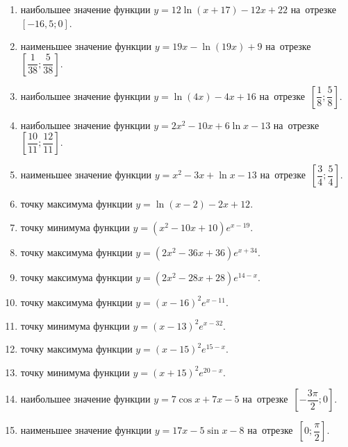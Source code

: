 \documentclass[a4paper,10pt]{article}
\begin{document}
\begin{enumerate}
\item {} наибольшее значение функции $y = 12\ln \left(x+17\right)-12x +22$ на~отрезке~$\left[-16,5;0\right]$.

\item {} наименьшее значение функции $y = 19x-\ln \left(19x\right)+9$ на~отрезке~$\left[\dfrac{1}{38};\dfrac{5}{38}\right]$.

\item {} наибольшее значение функции $y = \ln \left(4x\right)-4x+16$ на~отрезке~$\left[\dfrac{1}{8};\dfrac{5}{8}\right]$.

\item {} наибольшее значение функции $y=2x^2-10x+6\ln x-13$ на~отрезке~$\left[\dfrac{10}{11};\dfrac{12}{11}\right]$.

\item {} наименьшее значение функции $y=x^2-3x+\ln x-13$ на~отрезке~$\left[\dfrac{3}{4};\dfrac{5}{4}\right]$.

\item {} точку максимума функции $y=\ln \left(x-2\right)-2x+12$.

\item {} точку минимума функции $y=\left(x^2-10x+10\right)e^{x-19}$.

\item {} точку максимума функции $y=\left(2x^2-36x+36\right)e^{x+34}$.

\item {} точку максимума функции $y=\left(2x^2-28x+28\right)e^{14-x}$.

\item {} точку максимума функции $y=\left(x -16\right)^2e^{x-11}$.

\item {} точку минимума функции $y=\left(x -13\right)^2e^{x-32}$.

\item {} точку максимума функции $y=\left(x -15\right)^2e^{15-x}$.

\item {} точку минимума функции $y=\left(x +15\right)^2e^{20-x}$.

\item {} наибольшее значение функции $y=7\cos x+7x -5$ на~отрезке~$\left[-\dfrac{3\pi }{2};0\right]$.

\item {} наименьшее значение функции $y=17x-5\sin x -8$ на~отрезке~$\left[0;\dfrac{\pi }{2}\right]$.


\end{enumerate}
\end{document}
